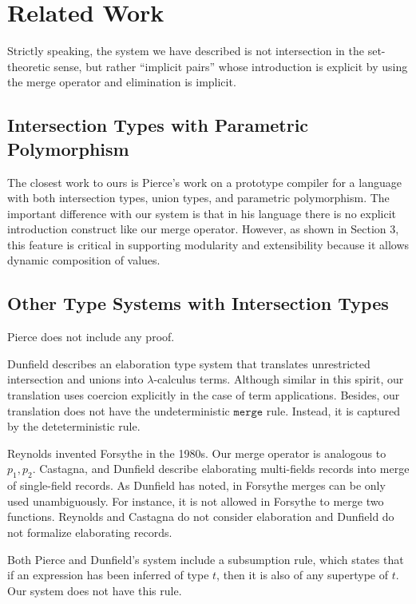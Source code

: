 \section{Related Work}

Strictly speaking, the system we have described is not intersection in the
set-theoretic sense, but rather ``implicit pairs'' whose introduction is
explicit by using the merge operator and elimination is implicit.

\subsection{Intersection Types with Parametric Polymorphism}

The closest work to ours is Pierce's work on a prototype compiler for a language
with both intersection types, union types, and parametric polymorphism. The
important difference with our system is that in his language there is no
explicit introduction construct like our merge operator. However, as shown in
Section 3, this feature is critical in supporting modularity and extensibility
because it allows dynamic composition of values.

\subsection{Other Type Systems with Intersection Types}

Pierce does not include any proof.


Dunfield describes an elaboration type system that translates unrestricted
intersection and unions into $\lambda$-calculus terms. Although similar in this
spirit, our translation uses coercion explicitly in the case of term
applications. Besides, our translation does not have the undeterministic
$ \texttt{merge} $ rule. Instead, it is captured by the deteterministic
 rule.

Reynolds invented Forsythe in the 1980s. Our merge operator is analogous to
$ p_1, p_2 $. Castagna, and Dunfield describe elaborating multi-fields records
into merge of single-field records. As Dunfield has noted, in Forsythe merges
can be only used unambiguously. For instance, it is not allowed in Forsythe to
merge two functions. Reynolds and Castagna do not consider elaboration and
Dunfield do not formalize elaborating records.

Both Pierce and Dunfield's system include a subsumption rule, which states that
if an expression has been inferred of type $ t $, then it is also of any
supertype of $ t $. Our system does not have this rule.

